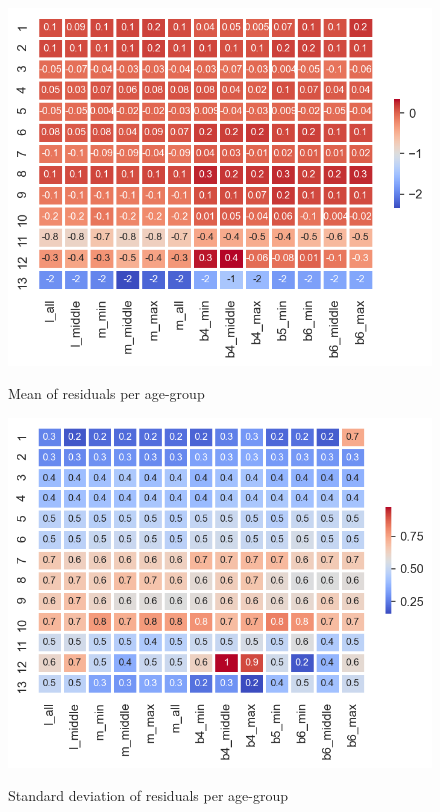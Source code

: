\documentclass[10pt,letterpaper]{article}
\begin{document}
\begin{figure}[h!]
  \caption{Mean of residuals per age-group}
  \centering
  \includegraphics[scale=0.5]{results/eda/age_mean.png}
  \label{age_acc}
\end{figure}

\begin{figure}[h!]
  \caption{Standard deviation of residuals per age-group}
  \centering
  \includegraphics[scale=0.5]{results/eda/age_std.png}
  \label{age_acc}
\end{figure}
\end{document}
